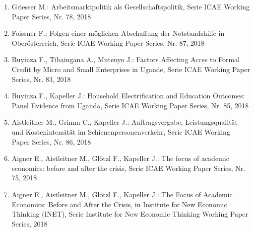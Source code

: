 \begin{enumerate}
	 \item Griesser M.: Arbeitsmarktpolitik als Gesellschaftspolitik, Serie ICAE Working Paper Series, Nr. 78, 2018
	 \item Foissner F.: Folgen einer möglichen Abschaffung der Notstandshilfe in Oberösterreich, Serie ICAE Working Paper Series, Nr. 87, 2018
	 \item Buyinza F., Tibaingana A., Mutenyo J.: Factors Affecting Acces to Formal Credit by Micro and Small Enterprises in Ugande, Serie ICAE Working Paper Series, Nr. 83, 2018
	 \item Buyinza F., Kapeller J.: Household Electrification and Education Outcomes: Panel Evidence from Uganda, Serie ICAE Working Paper Series, Nr. 85, 2018
	 \item Aistleitner M., Grimm C., Kapeller J.: Auftragsvergabe, Leistungsqualität und Kostenintensität im Schienenpersonenverkehr, Serie ICAE Working Paper Series, Nr. 86, 2018
	 \item Aigner E., Aistleitner M., Glötzl F., Kapeller J.: The focus of academic economics: before and after the crisis, Serie ICAE Working Paper Series, Nr. 75, 2018
	 \item Aigner E., Aistleitner M., Glötzl F., Kapeller J.: The Focus of Academic Economics: Before and After the Crisis, in Institute for New Economic Thinking (INET), Serie Institute for New Economic Thinking  Working Paper Series, 2018
\end{enumerate}
